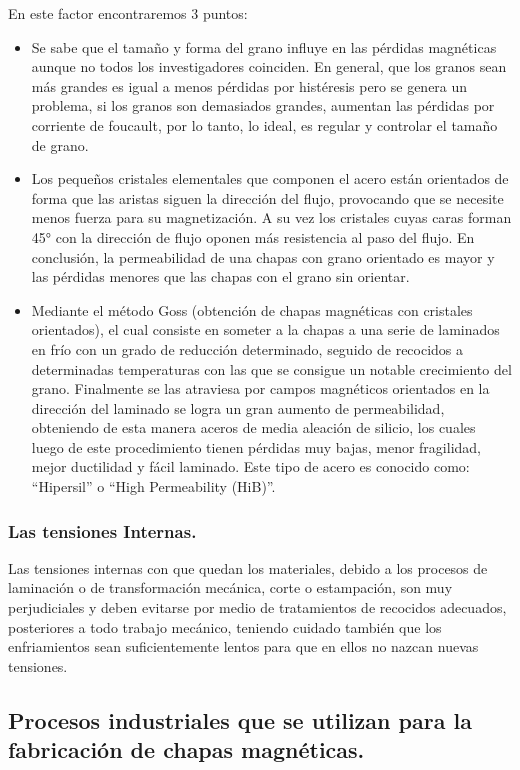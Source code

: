 \documentclass[12pt,a4paper]{article}
\begin{document}
En este factor encontraremos 3 puntos:
\begin{itemize}
    \item Se sabe que el tamaño y forma del grano influye en las pérdidas magnéticas aunque no todos los investigadores coinciden. En general, que los granos sean más grandes es igual a menos pérdidas por histéresis pero se genera un problema, si los granos son demasiados grandes, aumentan las pérdidas por corriente de foucault, por lo tanto, lo ideal, es regular y controlar el tamaño de grano.
    \item Los pequeños cristales elementales que componen el acero están orientados de forma que las aristas siguen la dirección del flujo, provocando que se necesite menos fuerza para su magnetización. A su vez los cristales cuyas caras forman 45° con la dirección de flujo oponen más resistencia al paso del flujo. En conclusión, la permeabilidad de una chapas con grano orientado es mayor y las pérdidas menores que las chapas con el grano sin orientar.
    \item Mediante el método Goss (obtención de chapas magnéticas con cristales orientados), el cual consiste en someter a la chapas a una serie de laminados en frío con un grado de reducción determinado, seguido de recocidos a determinadas temperaturas con las que se consigue un notable crecimiento del grano. Finalmente se las atraviesa por campos magnéticos orientados en la dirección del laminado se logra un gran aumento de permeabilidad, obteniendo de esta manera aceros de media aleación de silicio, los cuales luego de este procedimiento tienen pérdidas muy bajas, menor fragilidad, mejor ductilidad y fácil laminado. Este tipo de acero es conocido como: “Hipersil” o “High Permeability (HiB)”.
\end{itemize}

\subsubsection{Las tensiones Internas.}
Las tensiones internas con que quedan los materiales, debido a los procesos de laminación o de transformación mecánica, corte o estampación, son muy perjudiciales y deben evitarse por medio de tratamientos de recocidos adecuados, posteriores a todo trabajo mecánico, teniendo cuidado también que los enfriamientos sean suficientemente lentos para que en ellos no nazcan nuevas tensiones.

\subsection{Procesos industriales que se utilizan para la fabricación de chapas magnéticas.}
\end{document}
